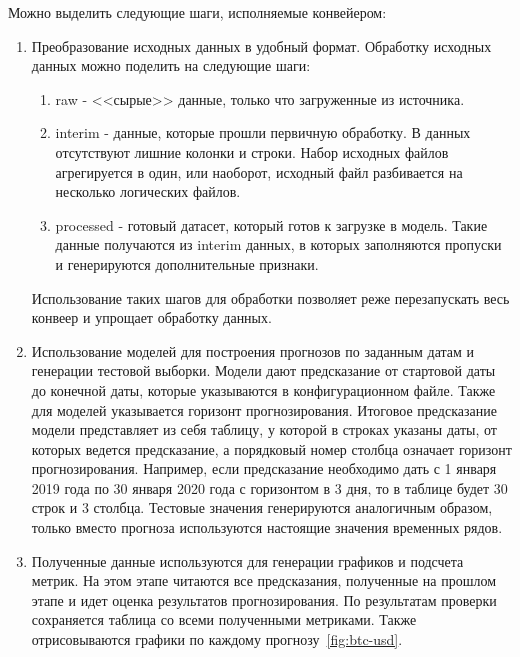 \documentclass[a4paper,article,14pt]{extarticle}
\begin{document}
Можно выделить следующие шаги, исполняемые конвейером:

\begin{enumerate}
     данные через API Yahoo finance по интересующим тикерам (котировкам) за указанный временной интервал. Для работы с API Yahoo finance используется python-библиотека yfinance.

    \item Преобразование исходных данных в удобный формат.
Обработку исходных данных можно поделить на следующие шаги:

    \begin{enumerate}
        \item raw - <<сырые>> данные, только что загруженные из источника.
        \item interim - данные, которые прошли первичную обработку.
    В данных отсутствуют лишние колонки и строки.
    Набор исходных файлов агрегируется в один, или наоборот, исходный файл разбивается на несколько логических файлов.
        \item processed - готовый датасет, который готов к загрузке в модель.
    Такие данные получаются из interim данных, в которых заполняются пропуски и генерируются дополнительные признаки.
    \end{enumerate}
    Использование таких шагов для обработки позволяет реже перезапускать весь конвеер и упрощает обработку данных.
    \item Использование моделей для построения прогнозов по заданным датам и генерации тестовой выборки.
Модели дают предсказание от стартовой даты до конечной даты, которые указываются в конфигурационном файле.
Также для моделей указывается горизонт прогнозирования.
Итоговое предсказание модели представляет из себя таблицу, у которой в строках указаны даты, от которых ведется предсказание, а порядковый номер столбца означает горизонт прогнозирования.
Например, если предсказание необходимо дать с 1 января 2019 года по 30 января 2020 года с горизонтом в 3 дня, то в таблице будет 30 строк и 3 столбца.
Тестовые значения генерируются аналогичным образом, только вместо прогноза используются настоящие значения временных рядов.
    \item Полученные данные используются для генерации графиков и подсчета метрик.
На этом этапе читаются все предсказания, полученные на прошлом этапе и идет оценка результатов прогнозирования.
По результатам проверки сохраняется таблица со всеми полученными метриками.
Также отрисовываются графики по каждому прогнозу~\ref{fig:btc-usd}.

\end{enumerate}
\end{document}
